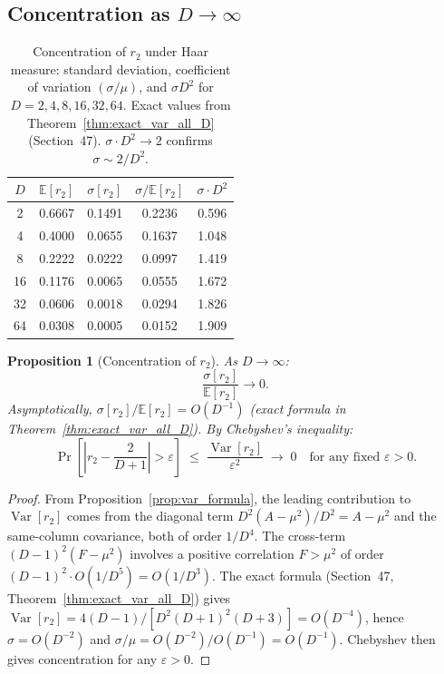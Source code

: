 \documentclass[12pt,a4paper]{article}
\newtheorem{proposition}[theorem]{Proposition}
\begin{document}
\subsection{Concentration as $D\to\infty$}
\label{sec:concentration}

\begin{table}[h!]
\centering
\caption{Concentration of $r_2$ under Haar measure: standard deviation, coefficient of variation
$(\sigma/\mu)$, and $\sigma D^{2}$ for $D=2,4,8,16,32,64$.
Exact values from Theorem~\ref{thm:exact_var_all_D} (Section~47).
$\sigma\cdot D^2\to 2$ confirms $\sigma\sim 2/D^2$.}
\label{tab:concentration}
\begin{tabular}{c|c|c|c|c}
$D$ & $\mathbb{E}[r_2]$ & $\sigma[r_2]$ & $\sigma/\mathbb{E}[r_2]$ & $\sigma\cdot D^{2}$ \\
\hline
2 & 0.6667 & 0.1491 & 0.2236 & 0.596 \\
4 & 0.4000 & 0.0655 & 0.1637 & 1.048 \\
8 & 0.2222 & 0.0222 & 0.0997 & 1.419 \\
16 & 0.1176 & 0.0065 & 0.0555 & 1.672 \\
32 & 0.0606 & 0.0018 & 0.0294 & 1.826 \\
64 & 0.0308 & 0.0005 & 0.0152 & 1.909 \\
\end{tabular}
\end{table}

\begin{proposition}[Concentration of $r_2$]
\label{prop:conc_r2}
As $D\to\infty$:
\[
  \frac{\sigma[r_2]}{\mathbb{E}[r_2]} \to 0.
\]
Asymptotically, $\sigma[r_2]/\mathbb{E}[r_2] = O(D^{-1})$ (exact formula in Theorem~\ref{thm:exact_var_all_D}).
By Chebyshev's inequality:
\[
  \Pr\!\left[\left|r_2 - \frac{2}{D+1}\right| > \varepsilon\right]
  \;\leq\; \frac{\operatorname{Var}[r_2]}{\varepsilon^2}
  \;\longrightarrow\; 0 \quad\text{for any fixed }\varepsilon>0.
\]
\end{proposition}

\begin{proof}
From Proposition~\ref{prop:var_formula}, the leading contribution to $\operatorname{Var}[r_2]$ comes from
the diagonal term $D^2(A-\mu^2)/D^2 = A-\mu^2$ and the same-column covariance,
both of order $1/D^4$.
The cross-term $(D-1)^2(F-\mu^2)$ involves a positive correlation $F>\mu^2$ of order $(D-1)^2\cdot O(1/D^5)=O(1/D^3)$.
The exact formula (Section~47, Theorem~\ref{thm:exact_var_all_D}) gives
$\operatorname{Var}[r_2]=4(D-1)/[D^2(D+1)^2(D+3)]=O(D^{-4})$,
hence $\sigma=O(D^{-2})$ and $\sigma/\mu=O(D^{-2})/O(D^{-1})=O(D^{-1})$.
Chebyshev then gives concentration for any $\varepsilon>0$.
\end{proof}
\end{document}

